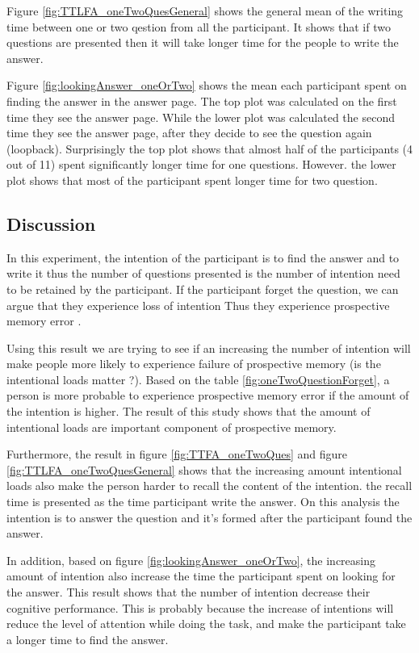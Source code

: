 Figure \ref{fig:TTLFA_oneTwoQuesGeneral} shows the general mean of the writing time between one or two qestion from all the participant.
It shows that if two questions are presented then it will take longer time for the people to write the answer.

Figure \ref{fig:lookingAnswer_oneOrTwo} shows the mean each participant spent on finding the answer in the answer page.
 The top plot was calculated on the first time they see the answer page.
 While the lower plot was calculated the second time they see the answer page, after they decide to see the question again (loopback).
Surprisingly the top plot shows that almost half of the participants (4 out of 11) spent significantly longer time for one questions.
However. the lower plot shows that most of the participant spent longer time for two question.

\subsection{Discussion}

In this experiment, the intention of the participant is to find the answer and to write it
thus the number of questions presented is the number of intention need to be retained by the participant.
If the participant forget the question, we can argue that they experience loss of intention Thus they experience
prospective memory error \citep{Reason1984}.

Using this result we are trying to see  if an increasing the number of intention will make people more likely to experience failure of prospective memory
(is the intentional loads matter ?).
Based on the table \ref{fig:oneTwoQuestionForget}, a person is more probable to experience prospective memory error if the amount of the intention is higher.
The result of this study shows that the amount of intentional loads are important component of prospective memory.

Furthermore, the result in figure \ref{fig:TTFA_oneTwoQues} and figure \ref{fig:TTLFA_oneTwoQuesGeneral} shows that the increasing amount intentional loads also
make the person harder to recall the content of the intention. the recall time is presented as the time participant write the answer.
On this analysis the intention is to answer the question and it's formed after the participant found the answer.

In addition, based on figure \ref{fig:lookingAnswer_oneOrTwo}, the increasing amount of intention also increase the time
the participant spent on looking for the answer. This result shows that the number of intention decrease their cognitive performance.
This is probably because the increase of intentions will reduce the level of attention while doing the task, and make
the participant take a longer time to find the answer.

